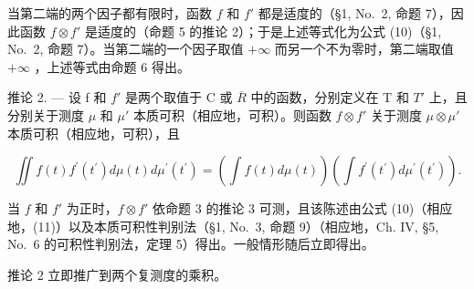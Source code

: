 当第二端的两个因子都有限时，函数 \(f\) 和 \(f'\) 都是适度的（§1, No.~2, 命题 7），因此函数 \(f \otimes f'\) 是适度的（命题 5 的推论 2）；于是上述等式化为公式 (10)（§1, No.~2, 命题 7）。当第二端的一个因子取值 \(+\infty\) 而另一个不为零时，第二端取值 \(+\infty\) ，上述等式由命题 6 得出。

推论 2. --- 设 f 和 \(f'\) 是两个取值于 C 或 \(\overline{R}\) 中的函数，分别定义在 T 和 \(T'\) 上，且分别关于测度 \(\mu\) 和 \(\mu'\) 本质可积（相应地，可积）。则函数 \(f \otimes f'\) 关于测度 \(\mu \otimes \mu'\) 本质可积（相应地，可积），且

\[
\iint f (t) f ^ {\prime} \left(t ^ {\prime}\right) d \mu (t) d \mu^ {\prime} \left(t ^ {\prime}\right) = \left(\int f (t) d \mu (t)\right) \left(\int f ^ {\prime} \left(t ^ {\prime}\right) d \mu^ {\prime} \left(t ^ {\prime}\right)\right).\tag{12}
\]

当 \(f\) 和 \(f'\) 为正时，\(f \otimes f'\) 依命题 3 的推论 3 可测，且该陈述由公式 (10)（相应地，(11)）以及本质可积性判别法（§1, No.~3, 命题 9）（相应地，Ch. IV, §5, No.~6 的可积性判别法，定理 5）得出。一般情形随后立即得出。

推论 2 立即推广到两个复测度的乘积。

